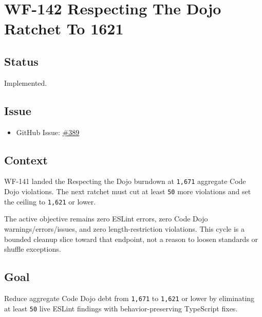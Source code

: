 \chapter{WF-142 Respecting The Dojo Ratchet To 1621}\label{record-224}

\smallskip

\section{Status}\label{record-224-status}

Implemented.

\section{Issue}\label{record-224-issue}

\begin{itemize}
\tightlist
\item
  GitHub Issue: \href{https://github.com/flyingrobots/bijou/issues/389}{\#389}
\end{itemize}

\section{Context}\label{record-224-context}

WF-141 landed the Respecting the Dojo burndown at \texttt{1\allowbreak{},\allowbreak{}6\allowbreak{}7\allowbreak{}1} aggregate Code Dojo violations. The next ratchet must cut at least \texttt{5\allowbreak{}0} more violations and set the ceiling to \texttt{1\allowbreak{},\allowbreak{}6\allowbreak{}2\allowbreak{}1} or lower.

The active objective remains zero ESLint errors, zero Code Dojo warnings/errors/issues, and zero length-restriction violations. This cycle is a bounded cleanup slice toward that endpoint, not a reason to loosen standards or shuffle exceptions.

\section{Goal}\label{record-224-goal}

Reduce aggregate Code Dojo debt from \texttt{1\allowbreak{},\allowbreak{}6\allowbreak{}7\allowbreak{}1} to \texttt{1\allowbreak{},\allowbreak{}6\allowbreak{}2\allowbreak{}1} or lower by eliminating at least \texttt{5\allowbreak{}0} live ESLint findings with behavior-preserving TypeScript fixes.

